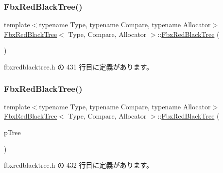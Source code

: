 \subsubsection{\texorpdfstring{Fbx\+Red\+Black\+Tree()}{FbxRedBlackTree()}\hspace{0.1cm}{\footnotesize\ttfamily [1/2]}}
{\footnotesize\ttfamily template$<$typename Type, typename Compare, typename Allocator$>$ \\
\hyperlink{class_fbx_red_black_tree}{Fbx\+Red\+Black\+Tree}$<$ Type, Compare, Allocator $>$\+::\hyperlink{class_fbx_red_black_tree}{Fbx\+Red\+Black\+Tree} (\begin{DoxyParamCaption}{ }\end{DoxyParamCaption})\hspace{0.3cm}{\ttfamily [inline]}}



 fbxredblacktree.\+h の 431 行目に定義があります。

\mbox{\label{class_fbx_red_black_tree_a2c4ff0fca7f156a399bc83d3e8822485}} 
\subsubsection{\texorpdfstring{Fbx\+Red\+Black\+Tree()}{FbxRedBlackTree()}\hspace{0.1cm}{\footnotesize\ttfamily [2/2]}}
{\footnotesize\ttfamily template$<$typename Type, typename Compare, typename Allocator$>$ \\
\hyperlink{class_fbx_red_black_tree}{Fbx\+Red\+Black\+Tree}$<$ Type, Compare, Allocator $>$\+::\hyperlink{class_fbx_red_black_tree}{Fbx\+Red\+Black\+Tree} (\begin{DoxyParamCaption}\item[{const \hyperlink{class_fbx_red_black_tree}{Fbx\+Red\+Black\+Tree}$<$ Type, Compare, Allocator $>$ \&}]{p\+Tree }\end{DoxyParamCaption})\hspace{0.3cm}{\ttfamily [inline]}}



 fbxredblacktree.\+h の 432 行目に定義があります。

\mbox{\label{class_fbx_red_black_tree_ae12987fd6ad76bbb3b65bb3aeebb449c}} 
